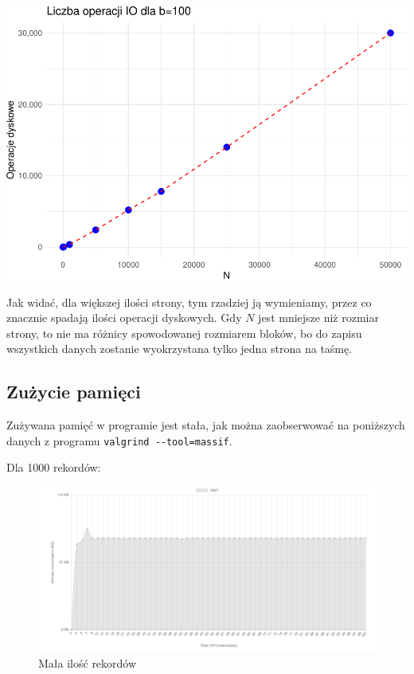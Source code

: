 \documentclass[
]{article}
\begin{document}
\includegraphics{sbd1_files/figure-latex/unnamed-chunk-3-1}

Jak widać, dla większej ilości strony, tym rzadziej ją wymieniamy, przez
co znacznie spadają ilości operacji dyskowych. Gdy \(N\) jest mniejsze
niż rozmiar strony, to nie ma różnicy spowodowanej rozmiarem bloków, bo
do zapisu wszystkich danych zostanie wyokrzystana tylko jedna strona na
taśmę.

\subsection{Zużycie pamięci}\label{zuux17cycie-pamiux119ci}

Zużywana pamięć w programie jest stała, jak można zaobserwować na
poniższych danych z programu \texttt{valgrind\ -\/-tool=massif}.

Dla 1000 rekordów:

\begin{figure}
\centering
\includegraphics{../res/visualizer_small.png}
\caption{Mała ilość rekordów}
\end{figure}
\end{document}
